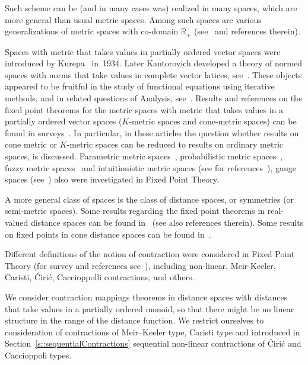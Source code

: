 \documentclass[12pt]{amsart}          %
\newcommand{\RR}{\mathbb R}
\begin{document}
Such scheme can be (and in many cases was) realized in many spaces, which are more general than usual metric spaces. Among such spaces are various generalizations of metric spaces with co-domain $\RR_+$ (see~\cite{Hitzler,Jleli,Roldan,VillaMorales,JS2,Kucha} and references therein).

Spaces with metric that takes values in partially ordered vector spaces were introduced by Kurepa~\cite{Kurepa} in~1934. Later Kantorovich developed a theory of normed spaces with norms that take values in complete vector latices, see~\cite{Kantorovich}. These objects appeared to be fruitful in the study of functional equations using iterative methods, and in related questions of Analysis, see~\cite{KVP}. 
 Results and references on the fixed point theorems for the metric spaces with metric that takes values in a partially ordered vector spaces ($K$-metric spaces and cone-metric spaces) can be found in surveys~\cite{Zabrejko, Jancovic}. In particular, in these articles the question whether results on cone metric or $K$-metric spaces can be reduced to results on ordinary metric spaces, is discussed.
 Parametric metric spaces~\cite{Husseinatall}, probabilistic metric spaces~\cite{Schweizer,HadzicPap}, fuzzy metric spaces~\cite{Schweizer,Rakic} and intuitionistic metric spaces (see for references~\cite{Husseinatall, Yadav}), gauge spaces {(see~\cite[Chapter~6]{Kelley})} also were investigated in Fixed Point Theory.
 
A more general class of spaces is the class of distance spaces, or symmetries (or semi-metric spaces).
Some results regarding the fixed point theorems in real-valued distance spaces can be found in~\cite{Kirk, Choban, ChobanBerinde,Arandelovichatall,Suzuki} (see also references therein).
 Some results on fixed points in  cone distance spaces can be found in~\cite{Radenovic_Kadelburg,Zhang}.

Different definitions of the notion of contraction were considered in Fixed Point Theory (for survey and references see~\cite{Granas,Kirk,kirk_shahzad,Wong}), including non-linear, Meir-Keeler, Caristi, \'Ciri\'c, Caccioppolli contractions, and others.

We consider contraction mappings theorems in distance spaces with distances that take values in a partially ordered monoid, so that there might be no linear structure in the range of the distance function. We restrict ourselves to consideration of contractions of Meir--Keeler type, Caristi type and introduced in Section~\ref{s::sequentialContractions} sequential non-linear contractions of \'Ciri\'c and Caccioppoli types.
\end{document}

